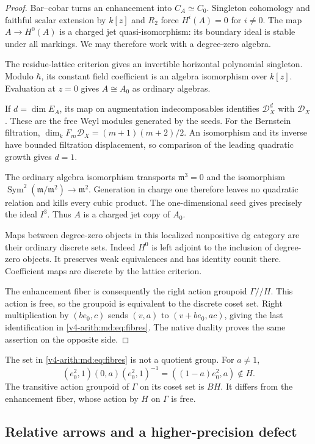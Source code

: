 \begin{proof}
Bar--cobar turns an enhancement into $C_A\simeq C_0$.
Singleton cohomology and faithful scalar extension
by $k[z]$ and $R_2$ force $H^i(A)=0$ for $i\ne0$.
The map $A\to H^0(A)$ is a charged jet
quasi-isomorphism: its boundary ideal is stable
under all markings. We may therefore work with
a degree-zero algebra.

The residue-lattice criterion gives an invertible
horizontal polynomial singleton. Modulo $\hbar$,
its constant field coefficient is an algebra
isomorphism over $k[z]$. Evaluation at $z=0$
gives $A\cong A_0$ as ordinary algebras.

If $d=\dim E_A$, its map on augmentation
indecomposables identifies $\mathcal D_X^d$
with $\mathcal D_X$. These are the free
Weyl modules generated by the seeds.
For the Bernstein filtration,
$\dim_kF_m\mathcal D_X=(m+1)(m+2)/2$.
An isomorphism and its inverse have bounded
filtration displacement, so comparison of the
leading quadratic growth gives $d=1$.

The ordinary algebra isomorphism transports
$\mathfrak m^3=0$ and the isomorphism
$\operatorname{Sym}^2(\mathfrak m/\mathfrak m^2)
\to\mathfrak m^2$. Generation in charge one
therefore leaves no quadratic relation and
kills every cubic product. The one-dimensional
seed gives precisely the ideal $I^3$.
Thus $A$ is a charged jet copy of $A_0$.

Maps between degree-zero objects in this localized
nonpositive dg category are their ordinary discrete
sets. Indeed $H^0$ is left adjoint to the inclusion
of degree-zero objects. It preserves weak
equivalences and has identity counit there.
Coefficient maps are discrete by the lattice
criterion.

The enhancement fiber is consequently
the right action groupoid $\Gamma//H$.
This action is free, so the groupoid is equivalent
to the discrete coset set. Right multiplication
by $(be_0,c)$ sends $(v,a)$ to $(v+be_0,ac)$,
giving the last identification in
\eqref{v4-arith:md:eq:fibres}.
The native duality proves the same assertion
on the opposite side.
\end{proof}

The set in \eqref{v4-arith:md:eq:fibres} is not
a quotient group. For $a\ne1$,
\[
 (e_0^2,1)(0,a)(e_0^2,1)^{-1}
 =((1-a)e_0^2,a)\notin H.
\]
The transitive action groupoid of $\Gamma$ on
its coset set is $BH$. It differs from the
enhancement fiber, whose action by $H$ on
$\Gamma$ is free.

\subsection{Relative arrows and a higher-precision defect}

